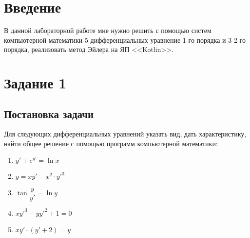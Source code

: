 \documentclass[a4paper, 14pt, fleqn]{extarticle}
\begin{document}
 
	
	
	\pagebreak
	\section{Введение}
		В данной лабораторной работе мне нужно решить с помощью систем компьютерной математики 5 дифференциальных уравнение 1-го порядка и 3 2-го порядка, реализовать метод Эйлера на ЯП <<Kotlin>>.

	\pagebreak
	\section{Задание 1}
		\subsection{Постановка задачи}
			\noindent Для следующих дифференциальных уравнений указать вид, дать характеристику, найти общее
			решение с помощью программ компьютерной математики:
		\begin{enumerate}
			\item \( y' + e^{y'} = \ln{x} \)
			\item \( y = xy' - x^2 \cdot y'^{3} \)
			\item \( \tan{\dfrac{y}{y'}} = \ln{y} \)
			\item \( xy'^3 - yy'^2 + 1 = 0 \)
			\item \( xy' \cdot (y' + 2) = y \)
		\end{enumerate}
\end{document}
